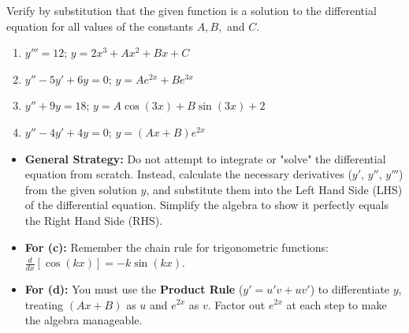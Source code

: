 
\begin{problem}
Verify by substitution that the given function is a solution to the differential equation for all values of the constants $A, B,$ and $C$.

\begin{enumerate}
    \item[\textbf{a}] $y''' = 12$; \qquad $y = 2x^3 + Ax^2 + Bx + C$
    \item[\textbf{b}] $y'' - 5y' + 6y = 0$; \qquad $y = Ae^{2x} + Be^{3x}$
    \item[\textbf{c}] $y'' + 9y = 18$; \qquad $y = A\cos(3x) + B\sin(3x) + 2$
    \item[\textbf{d}] $y'' - 4y' + 4y = 0$; \qquad $y = (Ax + B)e^{2x}$
\end{enumerate}
\end{problem}

\begin{hint}
\begin{itemize}
    \item \textbf{General Strategy:} Do not attempt to integrate or "solve" the differential equation from scratch. Instead, calculate the necessary derivatives ($y'$, $y''$, $y'''$) from the given solution $y$, and substitute them into the Left Hand Side (LHS) of the differential equation. Simplify the algebra to show it perfectly equals the Right Hand Side (RHS).
    \item \textbf{For (c):} Remember the chain rule for trigonometric functions: $\frac{d}{dx}[\cos(kx)] = -k\sin(kx)$.
    \item \textbf{For (d):} You must use the \textbf{Product Rule} ($y' = u'v + uv'$) to differentiate $y$, treating $(Ax + B)$ as $u$ and $e^{2x}$ as $v$. Factor out $e^{2x}$ at each step to make the algebra manageable.
\end{itemize}
\end{hint}

